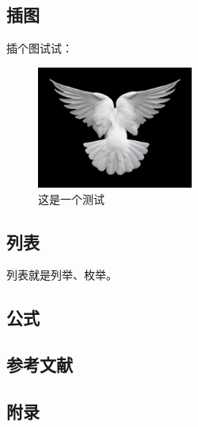 \subsection{插图}
插个图试试：
\begin{figure}[!h]
	\centering
	\includegraphics[height=4cm]{figures/dreamdove.png}
	\caption{这是一个测试}\label{fig1}
\end{figure}

\subsection{列表}
列表就是列举、枚举。

\subsection{公式}

\subsection{参考文献}

\subsection{附录}

